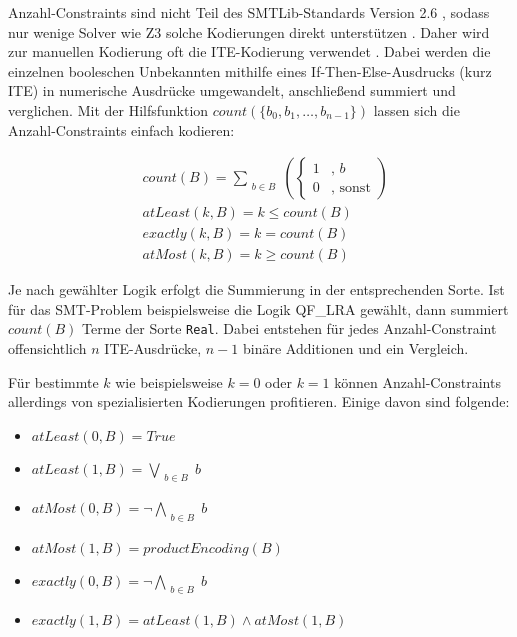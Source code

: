 Anzahl-Constraints sind nicht Teil des SMTLib-Standards Version 2.6 \cite{smtlib}, sodass nur wenige Solver wie Z3 solche Kodierungen direkt unterstützen \cite{z3Cardinality}.
Daher wird zur manuellen Kodierung oft die ITE-Kodierung verwendet \cite{kovasznai}.
Dabei werden die einzelnen booleschen Unbekannten mithilfe eines If-Then-Else-Ausdrucks (kurz ITE) in numerische Ausdrücke umgewandelt, anschließend summiert und verglichen.
Mit der Hilfsfunktion $count(\{b_0, b_1, \ldots, b_{n-1}\})$ lassen sich die Anzahl-Constraints einfach kodieren:

\[
    \begin{aligned}
        & count(B) = \sum_{\substack{b \in B}}
            \left(
                \begin{cases}
                    1 & \text{, } b \\
                    0 & \text{, sonst}
                \end{cases}
            \right) \\[5pt]
        & atLeast(k, B) = k \leq count(B) \\[5pt]
        & exactly(k, B) = k = count(B) \\[5pt]
        & atMost(k, B) = k \geq count(B)
    \end{aligned}
\]

Je nach gewählter Logik erfolgt die Summierung in der entsprechenden Sorte.
Ist für das SMT-Problem beispielsweise die Logik QF\_LRA gewählt, dann summiert $count(B)$ Terme der Sorte \texttt{Real}.
Dabei entstehen für jedes Anzahl-Constraint offensichtlich $n$ ITE-Ausdrücke, $n-1$ binäre Additionen und ein Vergleich.

Für bestimmte $k$ wie beispielsweise $k = 0$ oder $k = 1$ können Anzahl-Constraints allerdings von spezialisierten Kodierungen profitieren.
Einige davon sind folgende:
\begin{itemize}
    \item $atLeast(0,B) = True$
    \item $atLeast(1,B) = \bigvee\limits_{\substack{b \in B}} b $
    \item $atMost(0,B) = \neg\bigwedge\limits_{\substack{b \in B}} b$
    \item $atMost(1,B) = productEncoding(B)$
    \item $exactly(0,B) = \neg\bigwedge\limits_{\substack{b \in B}} b$
    \item $exactly(1,B) = atLeast(1,B) \land atMost(1,B)$
\end{itemize}

